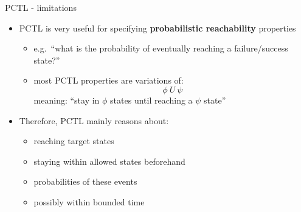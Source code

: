 \documentclass[dvipsnames]{beamer}
\begin{document}
\begin{frame}{PCTL - limitations}

    \begin{itemize}

        \item[]
              PCTL is very useful for specifying
              \textbf{probabilistic reachability} properties

              \begin{itemize}
                  \item[$-$]
                        e.g.\ ``what is the probability of eventually reaching
                        a failure/success state?''
                  \item[$-$]
                        most PCTL properties are variations of:
                        \[
                            \phi \ U \ \psi
                        \]
                        meaning:
                        ``stay in $\phi$ states until reaching a $\psi$ state''
              \end{itemize}

        \item[]
              Therefore, PCTL mainly reasons about:

              \begin{itemize}
                  \item[$-$]
                        reaching target states
                  \item[$-$]
                        staying within allowed states beforehand
                  \item[$-$]
                        probabilities of these events
                  \item[$-$]
                        possibly within bounded time
              \end{itemize}

    \end{itemize}

\end{frame}
\end{document}
